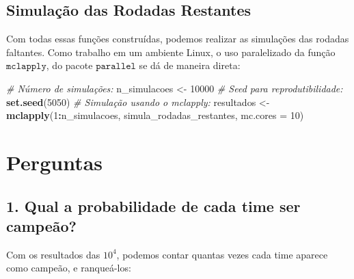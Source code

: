 \documentclass[11pt,]{article}
\newenvironment{Shaded}{\begin{snugshade}}{\end{snugshade}}
\newcommand{\AttributeTok}[1]{\textcolor[rgb]{0.13,0.29,0.53}{#1}}
\newcommand{\CommentTok}[1]{\textcolor[rgb]{0.56,0.35,0.01}{\textit{#1}}}
\newcommand{\DecValTok}[1]{\textcolor[rgb]{0.00,0.00,0.81}{#1}}
\newcommand{\FunctionTok}[1]{\textcolor[rgb]{0.13,0.29,0.53}{\textbf{#1}}}
\newcommand{\NormalTok}[1]{#1}
\newcommand{\OtherTok}[1]{\textcolor[rgb]{0.56,0.35,0.01}{#1}}
\newcommand{\SpecialCharTok}[1]{\textcolor[rgb]{0.81,0.36,0.00}{\textbf{#1}}}
\begin{document}
\hypertarget{simulauxe7uxe3o-das-rodadas-restantes}{%
\subsection{Simulação das Rodadas
Restantes}\label{simulauxe7uxe3o-das-rodadas-restantes}}

Com todas essas funções construídas, podemos realizar as simulações das
rodadas faltantes. Como trabalho em um ambiente Linux, o uso
paralelizado da função \(\texttt{mclapply}\), do pacote
\(\texttt{parallel}\) se dá de maneira direta:

\begin{Shaded}
\begin{Highlighting}[]
\CommentTok{\# Número de simulações:}
\NormalTok{n\_simulacoes }\OtherTok{\textless{}{-}} \DecValTok{10000}
\CommentTok{\# Seed para reprodutibilidade:}
\FunctionTok{set.seed}\NormalTok{(}\DecValTok{5050}\NormalTok{)}
\CommentTok{\# Simulação usando o mclapply:}
\NormalTok{resultados }\OtherTok{\textless{}{-}} \FunctionTok{mclapply}\NormalTok{(}\DecValTok{1}\SpecialCharTok{:}\NormalTok{n\_simulacoes, simula\_rodadas\_restantes,}
                       \AttributeTok{mc.cores =} \DecValTok{10}\NormalTok{)}
\end{Highlighting}
\end{Shaded}

\newpage

\hypertarget{perguntas}{%
\section{Perguntas}\label{perguntas}}

\hypertarget{qual-a-probabilidade-de-cada-time-ser-campeuxe3o}{%
\subsection{1. Qual a probabilidade de cada time ser
campeão?}\label{qual-a-probabilidade-de-cada-time-ser-campeuxe3o}}

Com os resultados das \ensuremath{10^{4}}, podemos contar quantas vezes
cada time aparece como campeão, e ranqueá-los:
\end{document}
